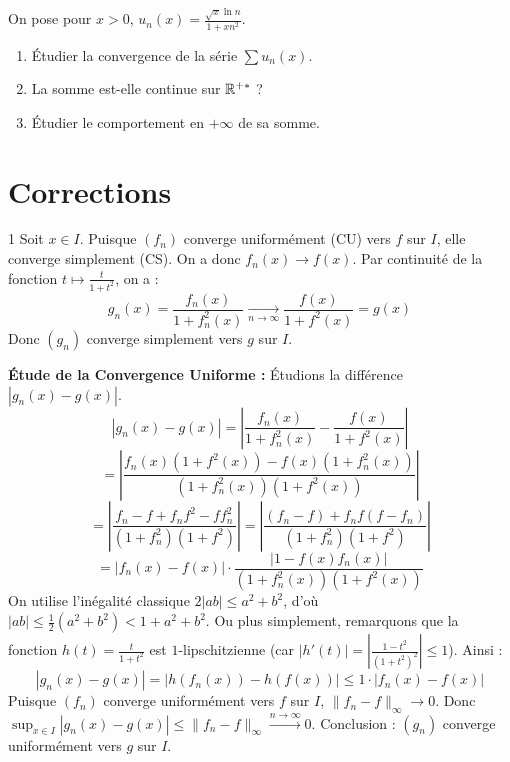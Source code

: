 \begin{exercice}
On pose pour $x>0$, $u_n(x) = \frac{\sqrt{x} \ln n}{1+x n^2}$.
\begin{enumerate}
    \item Étudier la convergence de la série $\sum u_n(x)$.
    \item La somme est-elle continue sur $\mathbb{R}^{+*}$ ?
    \item Étudier le comportement en $+\infty$ de sa somme.
\end{enumerate}
\end{exercice}

\newpage
\section{Corrections}

\begin{correction}{1}
Soit $x \in I$. Puisque $(f_n)$ converge uniformément (CU) vers $f$ sur $I$, elle converge simplement (CS).
On a donc $f_n(x) \to f(x)$.
Par continuité de la fonction $t \mapsto \frac{t}{1+t^2}$, on a :
$$ g_n(x) = \frac{f_n(x)}{1+f_n^2(x)} \xrightarrow[n\to\infty]{} \frac{f(x)}{1+f^2(x)} = g(x) $$
Donc $(g_n)$ converge simplement vers $g$ sur $I$.

\textbf{Étude de la Convergence Uniforme :}
Étudions la différence $|g_n(x) - g(x)|$.
$$ |g_n(x) - g(x)| = \left| \frac{f_n(x)}{1+f_n^2(x)} - \frac{f(x)}{1+f^2(x)} \right| $$
$$ = \left| \frac{f_n(x)(1+f^2(x)) - f(x)(1+f_n^2(x))}{(1+f_n^2(x))(1+f^2(x))} \right| $$
$$ = \left| \frac{f_n - f + f_n f^2 - f f_n^2}{(1+f_n^2)(1+f^2)} \right| = \left| \frac{(f_n - f) + f_n f (f - f_n)}{(1+f_n^2)(1+f^2)} \right| $$
$$ = |f_n(x) - f(x)| \cdot \frac{|1 - f(x)f_n(x)|}{(1+f_n^2(x))(1+f^2(x))} $$
On utilise l'inégalité classique $2|ab| \le a^2 + b^2$, d'où $|ab| \le \frac{1}{2}(a^2+b^2) < 1+a^2+b^2$. Ou plus simplement, remarquons que la fonction $h(t) = \frac{t}{1+t^2}$ est $1$-lipschitzienne (car $|h'(t)| = |\frac{1-t^2}{(1+t^2)^2}| \le 1$).
Ainsi :
$$ |g_n(x) - g(x)| = |h(f_n(x)) - h(f(x))| \le 1 \cdot |f_n(x) - f(x)| $$
Puisque $(f_n)$ converge uniformément vers $f$ sur $I$, $\|f_n - f\|_\infty \to 0$.
Donc $\sup_{x \in I} |g_n(x) - g(x)| \le \|f_n - f\|_\infty \xrightarrow{n\to\infty} 0$.
Conclusion : $(g_n)$ converge uniformément vers $g$ sur $I$.
\end{correction}

